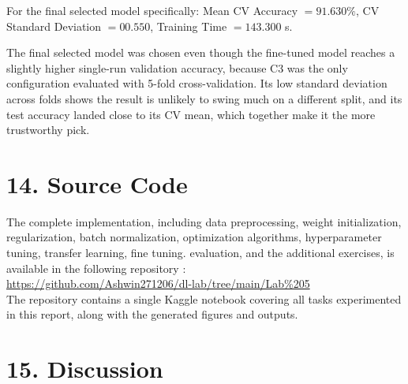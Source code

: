 \documentclass[10pt]{article}
\begin{document}
For the final selected model specifically: Mean CV Accuracy $=
91.630\%$, CV Standard Deviation $= 00.550$, Training Time $= 143.300$
s.

The final selected model was chosen even though the fine-tuned model
reaches a slightly higher single-run validation accuracy, because C3 was
the only configuration evaluated with 5-fold cross-validation. Its low
standard deviation across folds shows the result is unlikely to swing
much on a different split, and its test accuracy landed close to its CV
mean, which together make it the more trustworthy pick.

\section*{14. Source Code}

The complete implementation, including data preprocessing, weight initialization, regularization, batch normalization, optimization algorithms, hyperparameter tuning, transfer learning, fine tuning. evaluation, and the additional exercises, is available in the following repository :\\

    \hspace{25mm}  \url{https://github.com/Ashwin271206/dl-lab/tree/main/Lab%205}\\

The repository contains a single Kaggle notebook covering all tasks experimented in this report, along with the generated figures and outputs.

\section*{15. Discussion}
\end{document}
